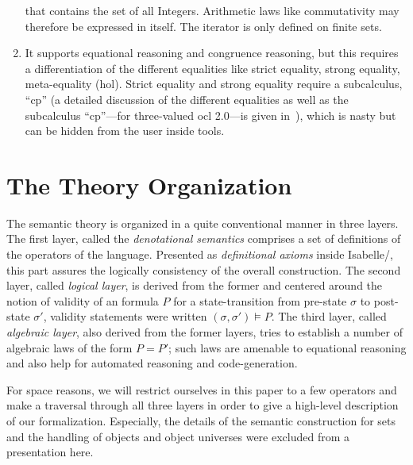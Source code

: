 \begin{enumerate}
  that contains the set of all Integers.  Arithmetic laws like
  commutativity may therefore be expressed in \OCL itself.  The
  iterator is only defined on finite sets.
\item It supports equational reasoning and congruence reasoning, but
  this requires a differentiation of the different equalities like
  strict equality, strong equality, meta-equality (\acs{hol}). Strict
  equality and strong equality require a subcalculus, ``cp'' (a
  detailed discussion of the different equalities as well as the
  subcalculus ``cp''---for three-valued \acs{ocl} 2.0---is given
  in~\cite{brucker.ea:semantics:2009}), which is nasty but can be
  hidden from the user inside tools.
\end{enumerate}

\section{The Theory Organization}
The semantic theory is organized in a quite conventional manner in
three layers. The first layer, called the \emph{denotational
  semantics} comprises a set of definitions of the operators of the
language.  Presented as \emph{definitional axioms} inside
Isabelle/\HOL, this part assures the logically consistency of the
overall construction. The second layer, called \emph{logical layer},
is derived from the former and centered around the notion of validity
of an \OCL formula $P$ for a state-transition from pre-state $\sigma$
to post-state $\sigma'$, validity statements were written $(\sigma,
\sigma') \models P$.  The third layer, called \emph{algebraic layer},
also derived from the former layers, tries to establish a number of
algebraic laws of the form $P = P'$; such laws are amenable to
equational reasoning and also help for automated reasoning and
code-generation.

For space reasons, we will restrict ourselves in this paper to a few
operators and make a traversal through all three layers in order to
give a high-level description of our formalization.  Especially, the
details of the semantic construction for sets and the handling of
objects and object universes were excluded from a presentation here.

